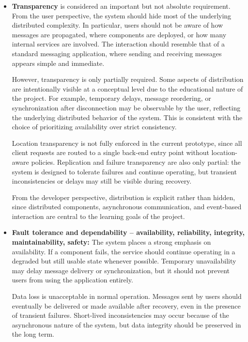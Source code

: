 \documentclass{scrartcl}
\begin{document}
\begin{itemize}
	\item \textbf{Transparency} is considered an important but not absolute requirement. From the user perspective, the system should hide most of the underlying distributed complexity. In particular, users should not be aware of how messages are propagated, where components are deployed, or how many internal services are involved. The interaction should resemble that of a standard messaging application, where sending and receiving messages appears simple and immediate.
	
	However, transparency is only partially required. Some aspects of distribution are intentionally visible at a conceptual level due to the educational nature of the project. For example, temporary delays, message reordering, or synchronization after disconnection may be observable by the user, reflecting the underlying distributed behavior of the system. This is consistent with the choice of prioritizing availability over strict consistency.
	
	Location transparency is not fully enforced in the current prototype, since all client requests are routed to a single back-end entry point without location-aware policies. Replication and failure transparency are also only partial: the system is designed to tolerate failures and continue operating, but transient inconsistencies or delays may still be visible during recovery.
	
	From the developer perspective, distribution is explicit rather than hidden, since distributed components, asynchronous communication, and event-based interaction are central to the learning goals of the project.
	
	\item \textbf{Fault tolerance and dependability -- availability, reliability, integrity, maintainability, safety:} The system places a strong emphasis on availability. If a component fails, the service should continue operating in a degraded but still usable state whenever possible. Temporary unavailability may delay message delivery or synchronization, but it should not prevent users from using the application entirely.
	
	Data loss is unacceptable in normal operation. Messages sent by users should eventually be delivered or made available after recovery, even in the presence of transient failures. Short-lived inconsistencies may occur because of the asynchronous nature of the system, but data integrity should be preserved in the long term.
	

\end{itemize}
\end{document}
